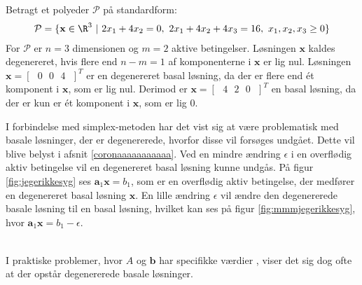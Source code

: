 \begin{eks}{}{}
%
%
Betragt et polyeder $\mathcal{P}$ på standardform: 
%
\begin{align*}
\mathcal{P} = \{ 
\mathbf{x} \in \R^3 \text{  } | 
\text{  } 2 x_1 + 4 x_2 = 0, 
\text{  } 2 x_1 + 4 x_2 + 4 x_3 = 16, 
\text{  } x_1 , x_2, x_3 \geq 0 \}
\end{align*}
%
For $\mathcal{P}$ er $n=3$ dimensionen og $m=2$ aktive betingelser. 
Løsningen $\mathbf{x}$ kaldes degenereret, hvis flere end $n-m=1$ af komponenterne i $\mathbf{x}$ er lig nul.
Løsningen $\mathbf{x}= [ \text{ } 0 \text{  } 0 \text{  } 4 \text{ } ]^T $ er en degenereret basal løsning, da der er flere end ét komponent i $\mathbf{x}$, som er lig nul. 
Derimod er  $\mathbf{x}= [ \text{ } 4 \text{  } 2 \text{  } 0 \text{ } ]^T $ en basal løsning, da der er kun er ét komponent i $\mathbf{x}$, som er lig $0$. 
%
\end{eks}
% 
%
%
I forbindelse med simplex-metoden har det vist sig at være problematisk med basale løsninger, der er degenererede, hvorfor disse vil forsøges undgået. 
Dette vil blive belyst i afsnit \ref{coronaaaaaaaaaaa}.
Ved en mindre ændring $\epsilon$ i en overflødig aktiv betingelse vil en degenereret basal løsning kunne undgås. 
På figur \ref{fig:jegerikkesyg} ses $\mathbf{a}_1 \mathbf{x} = b_1$, som er en overflødig aktiv betingelse, der medfører en degenereret basal løsning $\mathbf{x}$.
En lille ændring $\epsilon$ vil ændre den degenererede basale løsning til en basal løsning, hvilket kan ses på figur \ref{fig:mmmjegerikkesyg}, hvor 
$\mathbf{a}_1 \mathbf{x} = b_1 - \epsilon$.
%
%
\begin{center}
$
\begin{array}{cc}
&

\end{array}
$
\end{center}
%
%
I praktiske problemer, hvor $A$ og $\mathbf{b}$ har specifikke værdier , viser det sig dog ofte at der opstår degenererede basale løsninger.
%